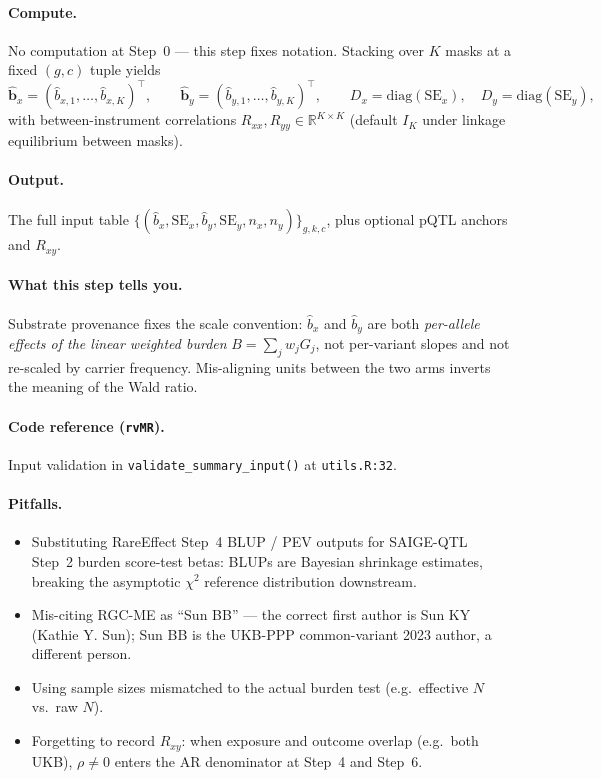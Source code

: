 \documentclass[11pt]{article}
\begin{document}
\paragraph{Compute.} No computation at Step~0 --- this step fixes notation. Stacking over $K$ masks at a fixed $(g,c)$ tuple yields
\begin{equation}
\hat{\boldsymbol b}_x = (\hat b_{x,1},\dots,\hat b_{x,K})^\top,\qquad \hat{\boldsymbol b}_y = (\hat b_{y,1},\dots,\hat b_{y,K})^\top,\qquad D_x = \mathrm{diag}(\mathrm{SE}_x),\quad D_y = \mathrm{diag}(\mathrm{SE}_y),
\label{eq:stack}
\end{equation}
with between-instrument correlations $R_{xx},R_{yy}\in\mathbb{R}^{K\times K}$ (default $I_K$ under linkage equilibrium between masks).

\paragraph{Output.} The full input table $\{(\hat b_x,\mathrm{SE}_x,\hat b_y,\mathrm{SE}_y,n_x,n_y)\}_{g,k,c}$, plus optional pQTL anchors and $R_{xy}$.

\paragraph{What this step tells you.} Substrate provenance fixes the scale convention: $\hat b_x$ and $\hat b_y$ are both \emph{per-allele effects of the linear weighted burden} $B=\sum_j w_j G_j$, not per-variant slopes and not re-scaled by carrier frequency. Mis-aligning units between the two arms inverts the meaning of the Wald ratio.

\paragraph{Code reference (\texttt{rvMR}).} Input validation in \verb|validate_summary_input()| at \verb|utils.R:32|.

\paragraph{Pitfalls.}
\begin{itemize}
\item Substituting RareEffect Step~4 BLUP / PEV outputs for SAIGE-QTL Step~2 burden score-test betas: BLUPs are Bayesian shrinkage estimates, breaking the asymptotic $\chi^2$ reference distribution downstream.
\item Mis-citing RGC-ME as ``Sun BB'' --- the correct first author is Sun KY (Kathie Y. Sun); Sun BB is the UKB-PPP common-variant 2023 author, a different person.
\item Using sample sizes mismatched to the actual burden test (e.g.\ effective $N$ vs.\ raw $N$).
\item Forgetting to record $R_{xy}$: when exposure and outcome overlap (e.g.\ both UKB), $\rho\ne 0$ enters the AR denominator at Step~4 and Step~6.
\end{itemize}
\end{document}
